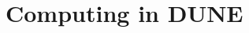 %

\newcommand{\ldword}[1]{{\bf{[#1]}}\footnote{define word#1}}
\newcommand{\ldshort}[1]{{\bf{[#1]}}\footnote{define abbr #1}}
\newcommand{\lcite}[1]{{\bf{[#1]}}\footnote{ add cite #1}}
\renewcommand\thedoctitle{\voltitleexec} %

%



\chapter{Computing in DUNE}
\label{ch:exec-comp}

